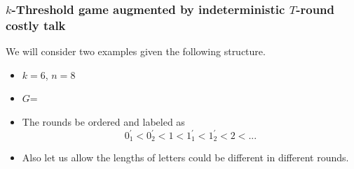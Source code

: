 \documentclass[9pt,handout]{beamer}
\begin{document}
\begin{frame}
  \frametitle{$k$-Threshold game augmented by indeterministic $T$-round costly talk}
  We will consider two examples given the following structure.
\begin{itemize}
\item $k=6$, $n=8$
\item $G$=
\begin{center}
\end{center}
\end{itemize}

\begin{itemize}
\item The rounds be ordered and labeled as \[0^{'}_1<0^{'}_{2}<1<1^{'}_{1}<1^{'}_{2}<2<...\]
\item Also let us allow the lengths of letters could be different in different rounds.
\end{itemize}

\end{frame}
\end{document}
